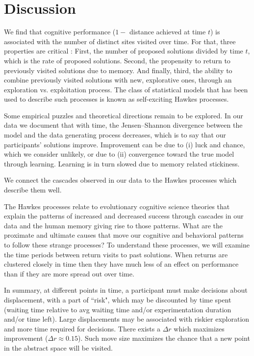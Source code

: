 \section{Discussion}
We find that cognitive performance ($1-$ distance achieved at time $t$) is associated with the number of distinct sites visited over time. For that, three properties are critical : First, the number of proposed solutions divided by time $t$, which is the rate of proposed solutions.  Second, the propensity to return to previously visited solutions due to memory. And finally, third, the ability to combine previously visited solutions with new, explorative ones, through an exploration vs. exploitation process.  The class of statistical models that has been used to describe such processes is known as self-exciting Hawkes processes. 

Some empirical puzzles and theoretical directions remain to be explored. 
In our data we document that with time, the Jensen–Shannon divergence between the model and the data generating process decreases, which is to say that our participants' solutions improve.  Improvement can be due to (i) luck and chance, which we consider unlikely, or due to (ii) convergence toward the true model through learning.  Learning is in turn slowed due to memory related stickiness. 
  
We connect the cascades observed in our data to the Hawkes processes which describe them well. 

The Hawkes processes relate to evolutionary cognitive science theories that explain the patterns of increased and decreased success through cascades in our data and the human memory giving rise to those patterns.  What are the proximate and ultimate causes that move our cognitive and behavioral patterns to follow these strange processes? To understand these processes, we will examine the time periods between return visits to past solutions.  When returns are clustered closely in time then they have much less of an effect on performance than if they are more spread out over time.  



In summary, at different points in time, a participant must make decisions about displacement, with a part of ``risk", which may be discounted by time spent (waiting time relative to avg waiting time and/or experimentation duration and/or time left). Large displacements may be associated with riskier exploration and more time required for decisions. There exists a $\Delta r$ which maximizes improvement ($\Delta r \approx 0.15$). Such move size maximizes the chance that a new point in the abstract space will be visited.













